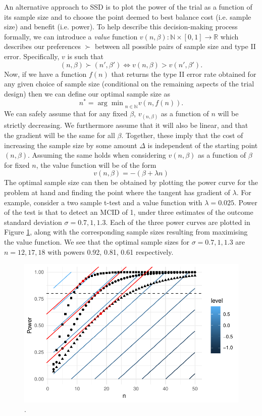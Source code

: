 \documentclass[sagev]{sagej}
\begin{document}
An alternative approach to SSD is to plot the power of the trial as a function of its sample size and to choose the point deemed to best balance cost (i.e. sample size) and benefit (i.e. power). To help describe this decision-making process formally, we can introduce a \emph{value} function $v(n, \beta): \mathbb{N} \times [0,1] \rightarrow \mathbb{R}$ which describes our preferences $\succ$ between all possible pairs of sample size and type II error. Specifically, $v$ is such that
$$
(n, \beta) \succ (n', \beta') \Leftrightarrow v(n, \beta) > v(n', \beta').
$$
Now, if we have a function $f(n)$ that returns the type II error rate obtained for any given choice of sample size (conditional on the remaining aspects of the trial design) then we can define our optimal sample size as
$$
n^* = {\arg\min}_{n \in \mathbb{N}} v(n, f(n)).
$$
We can safely assume that for any fixed $\beta$, $v_(n, \beta)$ as a function of $n$ will be strictly decreasing. We furthermore assume that it will also be linear, and that the gradient will be the same for all $\beta$. Together, these imply that the cost of increasing the sample size by some amount $\Delta$ is independent of the starting point $(n, \beta)$. Assuming the same holds when considering $v(n, \beta)$ as a function of $\beta$ for fixed $n$, the value function will be of the form
$$
v(n, \beta) = - (\beta + \lambda n)
$$
The optimal sample size can then be obtained by plotting the power curve for the problem at hand and finding the point where the tangent has gradient of $\lambda$. For example, consider a two sample t-test and a value function with $\lambda = 0.025$. Power of the test is that to detect an MCID of 1, under three estimates of the outcome standard deviation $\sigma = 0.7, 1, 1.3$. Each of the three power curves are plotted in Figure \ref{fig:ex1_3tangents}, along with the corresponding sample sizes resulting from maximising the value function. We see that the optimal sample sizes for $\sigma = 0.7, 1, 1.3$ are $n = 12, 17, 18$ with powers 0.92, 0.81, 0.61 respectively.

\begin{figure}
\centering
\includegraphics[scale=0.8]{./figures/ex1_3tangents}
\caption{.}
\label{fig:ex1_3tangents}
\end{figure}
\end{document}
